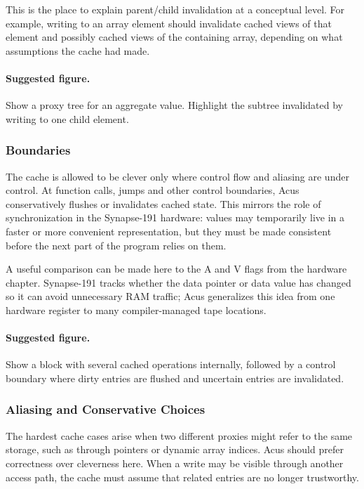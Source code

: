 This is the place to explain parent/child invalidation at a conceptual level. For example, writing to an array element should invalidate cached views of that element and possibly cached views of the containing array, depending on what assumptions the cache had made.

\paragraph{Suggested figure.}
Show a proxy tree for an aggregate value. Highlight the subtree invalidated by writing to one child element.

\subsubsection{Boundaries}
The cache is allowed to be clever only where control flow and aliasing are under control. At function calls, jumps and other control boundaries, Acus conservatively flushes or invalidates cached state. This mirrors the role of synchronization in the Synapse-191 hardware: values may temporarily live in a faster or more convenient representation, but they must be made consistent before the next part of the program relies on them.

A useful comparison can be made here to the A and V flags from the hardware chapter. Synapse-191 tracks whether the data pointer or data value has changed so it can avoid unnecessary RAM traffic; Acus generalizes this idea from one hardware register to many compiler-managed tape locations.

\paragraph{Suggested figure.}
Show a block with several cached operations internally, followed by a control boundary where dirty entries are flushed and uncertain entries are invalidated.

\subsubsection{Aliasing and Conservative Choices}
The hardest cache cases arise when two different proxies might refer to the same storage, such as through pointers or dynamic array indices. Acus should prefer correctness over cleverness here. When a write may be visible through another access path, the cache must assume that related entries are no longer trustworthy.

